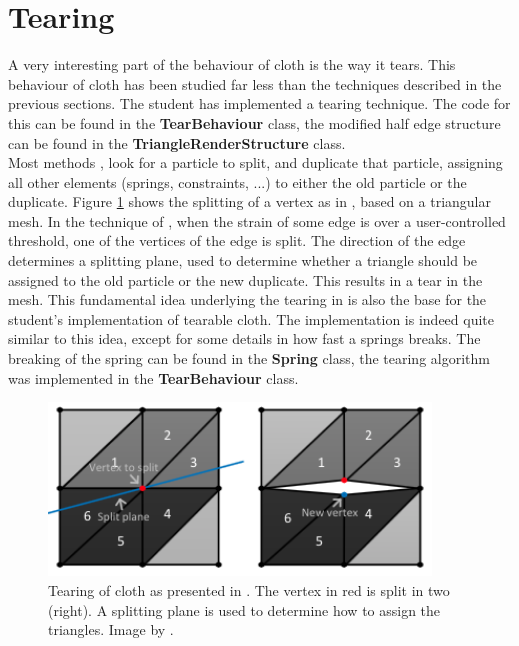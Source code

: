 \ifx\isEmbedded\undefined

\graphicspath{{../img/}}

\tableofcontents
\pagebreak

\fi

\section{Tearing}\label{sec_tear}

A very interesting part of the behaviour of cloth is the way it tears. This behaviour of cloth has been studied far less than the techniques described in the previous sections. The student has implemented a tearing technique. The code for this can be found in the {\bf TearBehaviour} class, the modified half edge structure can be found in the {\bf TriangleRenderStructure} class.\\

Most methods \citep{molino_changemesh, position_based_dyn, fast_sim_tearing}, look for a particle to split, and duplicate that particle, assigning all other elements (springs, constraints, ...) to either the old particle or the duplicate. Figure \ref{fig_split} shows the splitting of a vertex as in \citep{fast_sim_tearing}, based on a triangular mesh. In the technique of \cite{fast_sim_tearing}, when the strain of some edge is over a user-controlled threshold, one of the vertices of the edge is split. The direction of the edge determines a splitting plane, used to determine whether a triangle should be assigned to the old particle or the new duplicate. This results in a tear in the mesh. This fundamental idea underlying the tearing in \cite{fast_sim_tearing} is also the base for the student's implementation of tearable cloth. The implementation is indeed quite similar to this idea, except for some details in how fast a springs breaks. The breaking of the spring can be found in the {\bf Spring} class, the tearing algorithm was implemented in the {\bf TearBehaviour} class.\\

\begin{figure}[!htb]
  \centering
  \includegraphics[width=4in,natwidth=366,natheight=166]{img/splitVertex.png}
  \caption
   {Tearing of cloth as presented in \cite{fast_sim_tearing}. The vertex in red is split in two (right). A splitting plane is used to determine how to assign the triangles. Image by \cite{fast_sim_tearing}.}
 \label{fig_split}
\end{figure}

